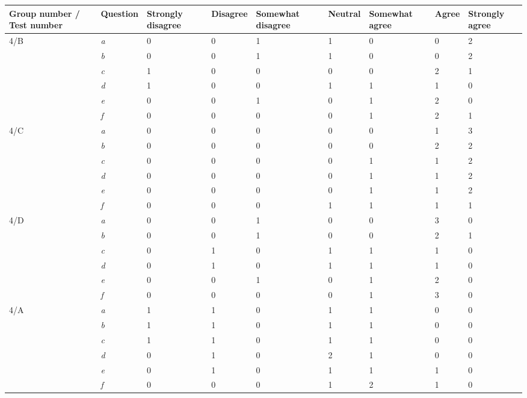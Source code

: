 		
\begin{center}\small \label{Test4}
	\begin{tabular}{ p{1.4cm} | p{1.4cm} | p{1.3cm} | p{1.4cm} | p{1.7cm} | p{1.2cm} | p{1.7cm} | p{0.9cm}| p{1.3cm} |}
\hline
\textbf{Group number / Test 	number} &\textbf{Question}	&	\textbf{Strongly disagree}	&	\textbf{Disagree}	&	\textbf{Somewhat disagree}	&	\textbf{Neutral}	&	\textbf{Somewhat agree}	&	\textbf{Agree}	&	\textbf{Strongly agree} \\ \hline		
4/B		&	\textit{a}	&	0	&	0	&	1	&	1	&	0	&	0	&	2	\\ \hline
		&	\textit{b}	&	0	&	0	&	1	&	1	&	0	&	0	&	2	\\ \hline
		&	\textit{c}	&	1	&	0	&	0	&	0	&	0	&	2	&	1	\\ \hline
		&	\textit{d}	&	1	&	0	&	0	&	1	&	1	&	1	&	0	\\ \hline
		&	\textit{e}	&	0	&	0	&	1	&	0	&	1	&	2	&	0	\\ \hline
		&	\textit{f}	&	0	&	0	&	0	&	0	&	1	&	2	&	1	\\ \hline
4/C		&	\textit{a}	&	0	&	0	&	0	&	0	&	0	&	1	&	3	\\ \hline
		&	\textit{b}	&	0	&	0	&	0	&	0	&	0	&	2	&	2	\\ \hline
		&	\textit{c}	&	0	&	0	&	0	&	0	&	1	&	1	&	2	\\ \hline
		&	\textit{d}	&	0	&	0	&	0	&	0	&	1	&	1	&	2	\\ \hline
		&	\textit{e}	&	0	&	0	&	0	&	0	&	1	&	1	&	2	\\ \hline
		&	\textit{f}	&	0	&	0	&	0	&	1	&	1	&	1	&	1	\\ \hline
4/D		&	\textit{a}	&	0	&	0	&	1	&	0	&	0	&	3	&	0	\\ \hline
		&	\textit{b}	&	0	&	0	&	1	&	0	&	0	&	2	&	1	\\ \hline
		&	\textit{c}	&	0	&	1	&	0	&	1	&	1	&	1	&	0	\\ \hline
		&	\textit{d}	&	0	&	1	&	0	&	1	&	1	&	1	&	0	\\ \hline
		&	\textit{e}	&	0	&	0	&	1	&	0	&	1	&	2	&	0	\\ \hline
		&	\textit{f}	&	0	&	0	&	0	&	0	&	1	&	3	&	0	\\ \hline
4/A		&	\textit{a}	&	1	&	1	&	0	&	1	&	1	&	0	&	0	\\ \hline
		&	\textit{b}	&	1	&	1	&	0	&	1	&	1	&	0	&	0	\\ \hline
		&	\textit{c}	&	1	&	1	&	0	&	1	&	1	&	0	&	0	\\ \hline
		&	\textit{d}	&	0	&	1	&	0	&	2	&	1	&	0	&	0	\\ \hline
		&	\textit{e}	&	0	&	1	&	0	&	1	&	1	&	1	&	0	\\ \hline
		&	\textit{f}	&	0	&	0	&	0	&	1	&	2	&	1	&	0	\\ \hline

	\end{tabular}
\end{center}		
		
